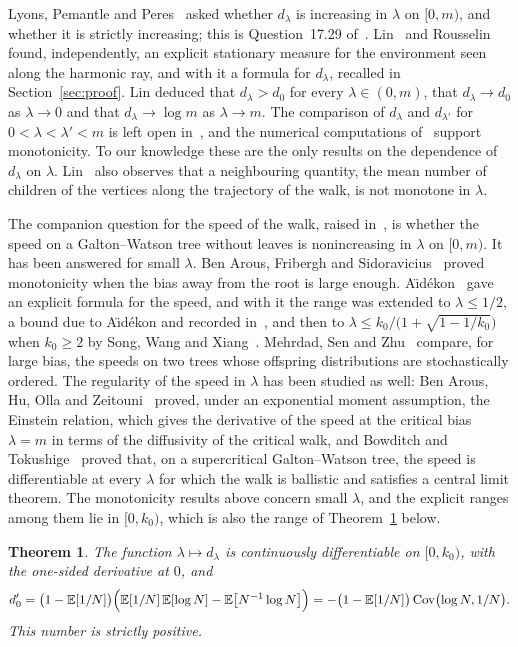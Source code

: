 \documentclass[11pt]{amsart}
\newtheorem{theorem}{Theorem}
\theoremstyle{definition}
\newcommand{\E}{\mathbb{E}}
\newcommand{\Cov}{\operatorname{Cov}}
\begin{document}
Lyons, Pemantle and Peres~\cite{LPP97} asked whether $d_\lambda$ is increasing in $\lambda$ on $[0,m)$, and
whether it is strictly increasing; this is Question~17.29 of~\cite{LyonsPeres}. Lin~\cite{Lin} and
Rousselin~\cite{Rousselin} found, independently, an explicit stationary measure for the environment seen along
the harmonic ray, and with it a formula for $d_\lambda$, recalled in Section~\ref{sec:proof}. Lin deduced that
$d_\lambda>d_0$ for every $\lambda\in(0,m)$, that $d_\lambda\to d_0$ as $\lambda\to0$ and that
$d_\lambda\to\log m$ as $\lambda\to m$. The comparison of $d_\lambda$ and $d_{\lambda'}$ for
$0<\lambda<\lambda'<m$ is left open in~\cite{Lin}, and the numerical computations of~\cite{Rousselin} support
monotonicity. To our knowledge these are the only results on the dependence of $d_\lambda$ on $\lambda$.
Lin~\cite{Lin} also observes that a neighbouring quantity, the mean number of children of the vertices along the
trajectory of the walk, is not monotone in $\lambda$.

The companion question for the speed of the walk, raised in~\cite{LPP96,LPP97}, is whether the speed on a
Galton--Watson tree without leaves is nonincreasing in $\lambda$ on $[0,m)$. It has been answered for small
$\lambda$. Ben Arous, Fribergh and Sidoravicius~\cite{BFS} proved monotonicity when the bias away from the root
is large enough. A\"{\i}d\'ekon~\cite{Aidekon} gave an explicit formula for the speed, and with it the range was
extended to $\lambda\le1/2$, a bound due to A\"{\i}d\'ekon and recorded in~\cite{SWX}, and then to
$\lambda\le k_0/\bigl(1+\sqrt{1-1/k_0}\bigr)$ when $k_0\ge2$ by Song, Wang and Xiang~\cite{SWX}. Mehrdad, Sen and
Zhu~\cite{MSZ} compare, for large bias, the speeds on two trees whose offspring distributions are stochastically
ordered. The regularity of the speed in $\lambda$ has been studied as well: Ben Arous, Hu, Olla and
Zeitouni~\cite{BHOZ} proved, under an exponential moment assumption, the Einstein relation, which gives the derivative of the speed at the critical
bias $\lambda=m$ in terms of the diffusivity of the critical walk, and Bowditch and Tokushige~\cite{BT} proved that,
on a supercritical Galton--Watson tree, the speed is differentiable at every $\lambda$ for which the walk is ballistic and satisfies a central limit
theorem. The monotonicity results above concern small $\lambda$, and the explicit ranges among them lie in
$[0,k_0)$, which is also the range of Theorem~\ref{thm:main} below.

\begin{theorem}\label{thm:main}
The function $\lambda\mapsto d_\lambda$ is continuously differentiable on $[0,k_0)$, with the one-sided
derivative at $0$, and
\begin{equation}\label{eq:slope}
   d_0'=\bigl(1-\E[1/N]\bigr)\Bigl(\E[1/N]\,\E[\log N]-\E\bigl[N^{-1}\log N\bigr]\Bigr)
       =-\bigl(1-\E[1/N]\bigr)\Cov\bigl(\log N,1/N\bigr) .
\end{equation}
This number is strictly positive.
\end{theorem}
\end{document}
